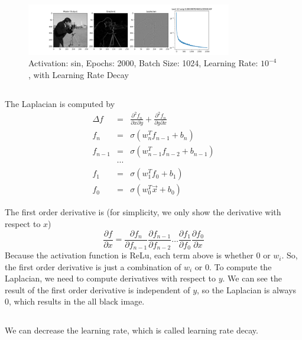 \documentclass[12pt]{article}
\begin{document}
\begin{figure}[H]
    \centering
    \includegraphics[width=0.8\textwidth]{imgs/siren_sin_e2000_b1024_lr10-4_decay.png}
    \caption{Activation: sin, Epochs: 2000, Batch Size: 1024, Learning Rate: $10^{-4}$, with Learning Rate Decay}
    \label{fig:5-5-sin}
\end{figure}
\subsection{}
The Laplacian is computed by 
\begin{eqnarray}
    \Delta f &=& \frac{\partial^2 f_n}{\partial x \partial y} + \frac{\partial^2 f_n}{\partial y \partial x} \nonumber \\
    f_n &=& \sigma(w_n^T f_{n-1} + b_n) \nonumber \\
    f_{n-1} &=& \sigma(w_{n-1}^T f_{n-2} + b_{n-1}) \nonumber \\
    &\cdots& \nonumber \\
    f_1 &=& \sigma(w_1^T f_0 + b_1) \nonumber \\
    f_0 &=& \sigma(w_0^T \vec{x} + b_0) \nonumber 
\end{eqnarray}

The first order derivative is (for simplicity, we only show the derivative with respect to $x$)
\begin{equation}
    \frac{\partial f}{\partial x} = \frac{\partial f_n}{\partial f_{n-1}} \frac{\partial f_{n-1}}{\partial f_{n-2}} \dots \frac{\partial f_1}{\partial f_0} \frac{\partial f_0}{\partial x} \nonumber
\end{equation}
Because the activation function is ReLu, each term above is whether 0 or $w_i$. So, the first order derivative is just a combination of $w_i$ or 0. To compute the Laplacian, we need to compute derivatives with respect to $y$. We can see the result of the first order derivative is independent of $y$, so the Laplacian is always 0, which results in the all black image.

\subsection{}
We can decrease the learning rate, which is called learning rate decay.
\end{document}
